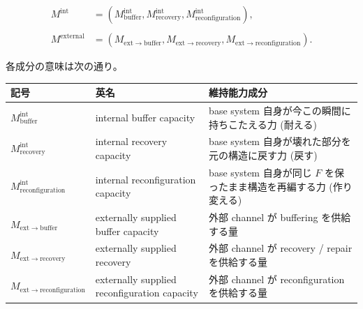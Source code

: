 \documentclass[12pt,a4paper]{article}
\begin{document}
\begin{definition}

$$
\begin{aligned}
M^{\mathrm{int}} &= (M_{\mathrm{buffer}}^{\mathrm{int}}, M_{\mathrm{recovery}}^{\mathrm{int}}, M_{\mathrm{reconfiguration}}^{\mathrm{int}}), \\
\quad \\
M^{\mathrm{external}} &= (M_{\mathrm{ext}\to\mathrm{buffer}}, M_{\mathrm{ext}\to\mathrm{recovery}}, M_{\mathrm{ext}\to\mathrm{reconfiguration}}).
\end{aligned}
$$

\end{definition}

各成分の意味は次の通り。

{\def\LTcaptype{table} %
\begin{longtable}[]{@{}
  >{\raggedright\arraybackslash}p{}
  >{\raggedright\arraybackslash}p{}
  >{\raggedright\arraybackslash}p{}@{}}
\toprule\noalign{}
\begin{minipage}[b]{\linewidth}\raggedright
記号
\end{minipage} & \begin{minipage}[b]{\linewidth}\raggedright
英名
\end{minipage} & \begin{minipage}[b]{\linewidth}\raggedright
維持能力成分
\end{minipage} \\
\midrule\noalign{}
\endhead
\bottomrule\noalign{}
\endlastfoot
\(M_{\mathrm{buffer}}^{\mathrm{int}}\) & internal buffer capacity & base system 自身が今この瞬間に持ちこたえる力 (耐える) \\
\(M_{\mathrm{recovery}}^{\mathrm{int}}\) & internal recovery capacity & base system 自身が壊れた部分を元の構造に戻す力 (戻す) \\
\(M_{\mathrm{reconfiguration}}^{\mathrm{int}}\) & internal reconfiguration capacity & base system 自身が同じ \(F\) を保ったまま構造を再編する力 (作り変える) \\
\(M_{\mathrm{ext}\to\mathrm{buffer}}\) & externally supplied buffer capacity & 外部 channel が buffering を供給する量 \\
\(M_{\mathrm{ext}\to\mathrm{recovery}}\) & externally supplied recovery & 外部 channel が recovery / repair を供給する量 \\
\(M_{\mathrm{ext}\to\mathrm{reconfiguration}}\) & externally supplied reconfiguration capacity & 外部 channel が reconfiguration を供給する量 \\
\end{longtable}
}
\end{document}
